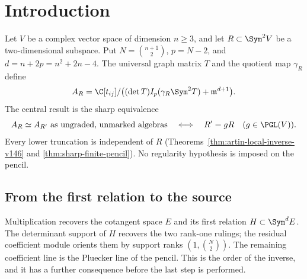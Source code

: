 \begin{abstract}
An unmarked, ungraded finite multiplication-failure algebra recovers
every complex quadratic pencil at the sharp order $n^2+2n-4$, including
singular pencils. The inverse reconstructs the tensor rulings and
orients them by unequal coefficient-support ranks. Before recovering
the pencil coefficient line, its first relation already determines
the native source projective space. We construct on that space a
source-normalized determinant-apolar algebra bundle and its projective
power diagram, functorially under arbitrary ungraded algebra
isomorphisms. Scalar twists cancel in the algebra bundle, so no
splitting of an auxiliary normalization fibre is used. The relative
inverse and the detailed geometric and local forms are included. On the simple corank-two incidence open, the
multiplication diagram also recovers the centre and Rees algebra of
the Hilbert boundary modification; a first normal deformation selects
its embedded limit.
\end{abstract}
\maketitle
\section{Introduction}
\label{sec:paper-i-v158}
Let $V$ be a complex vector space of dimension $n\geq3$, and let
$R\subset\Sym^2V$ be a two-dimensional subspace. Put
$N=\binom{n+1}{2}$, $p=N-2$, and $d=n+2p=n^2+2n-4$.
The universal graph matrix $T$ and the quotient map $\gamma_R$ define
\[
 A_R=\C[t_{ij}]/\bigl((\det T)I_p(\gamma_R\Sym^2T)
                                      +\mathfrak m^{d+1}\bigr).
\]
The central result is the sharp equivalence
\[
 A_R\simeq A_{R'}\text{ as ungraded, unmarked algebras}
 \quad\Longleftrightarrow\quad R'=gR\quad(g\in\PGL(V)).
\]
Every lower truncation is independent of $R$
(Theorems~\ref{thm:artin-local-inverse-v146} and
\ref{thm:sharp-finite-pencil}). No regularity hypothesis is imposed
on the pencil.

\subsection{From the first relation to the source}
Multiplication recovers the cotangent space $E$ and its first relation
$H\subset\Sym^dE$. The determinant support of $H$ recovers the two
rank-one rulings; the residual coefficient module orients them by
support ranks $(1,\binom N2)$. The remaining coefficient line is the
Pluecker line of the pencil. This is the order of the inverse, and it
has a further consequence before the last step is performed.

